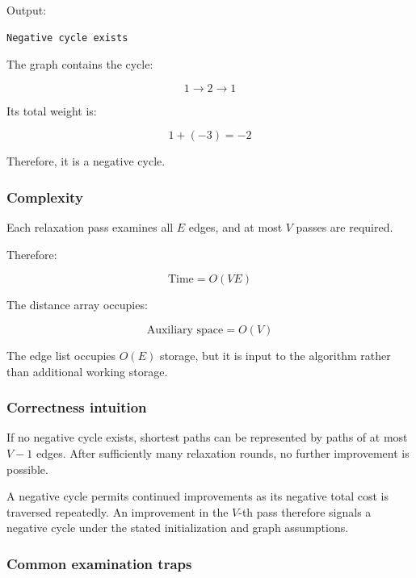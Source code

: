 Output:

\begin{lstlisting}[style=pseudocode]
Negative cycle exists
\end{lstlisting}

The graph contains the cycle:


\[
1\rightarrow2\rightarrow1
\]


Its total weight is:


\[
1+(-3)=-2
\]


Therefore, it is a negative cycle.

\subsubsection{Complexity}

Each relaxation pass examines all $E$ edges, and at most $V$ passes are required.

Therefore:


\[
\boxed{\text{Time}=O(VE)}
\]


The distance array occupies:


\[
\boxed{\text{Auxiliary space}=O(V)}
\]


The edge list occupies $O(E)$ storage, but it is input to the algorithm rather than additional working storage.

\subsubsection{Correctness intuition}

If no negative cycle exists, shortest paths can be represented by paths of at most $V-1$ edges. After sufficiently many relaxation rounds, no further improvement is possible.

A negative cycle permits continued improvements as its negative total cost is traversed repeatedly. An improvement in the $V$-th pass therefore signals a negative cycle under the stated initialization and graph assumptions.

\subsubsection{Common examination traps}

